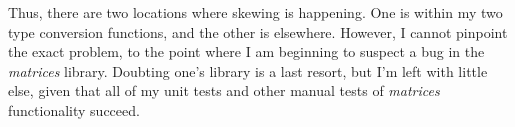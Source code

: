 \documentclass{article}
\begin{document}
Thus, there are two locations where skewing is happening. One is within
my two type conversion functions, and the other is elsewhere. However,
I cannot pinpoint the exact problem, to the point where I am beginning to
suspect a bug in the \emph{matrices} library. Doubting one's library is
a last resort, but I'm left with little else, given that all of my unit
tests and other manual tests of \emph{matrices} functionality succeed.
\end{document}
